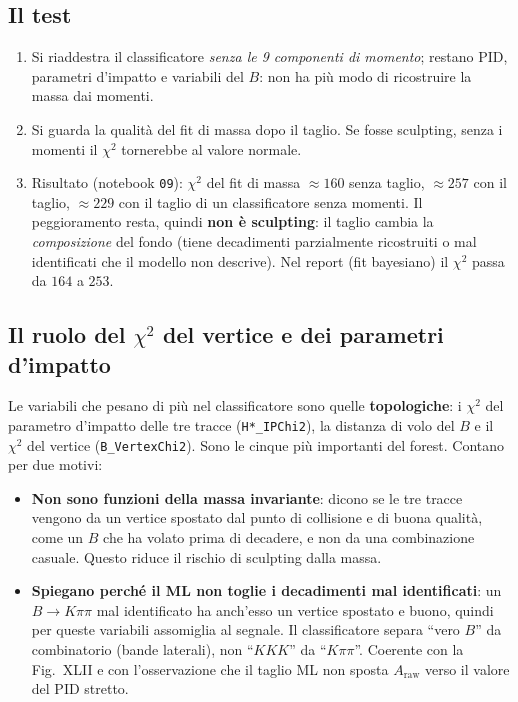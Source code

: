 \documentclass[10.5pt,a4paper]{article}
\newcommand{\Araw}{A_{\mathrm{raw}}}
\begin{document}
\subsection*{Il test}
\begin{enumerate}
\item Si riaddestra il classificatore \emph{senza le 9 componenti di momento}; restano PID, parametri d'impatto e variabili del $B$:
non ha più modo di ricostruire la massa dai momenti.
\item Si guarda la qualità del fit di massa dopo il taglio. Se fosse sculpting, senza i momenti il $\chi^2$ tornerebbe al valore normale.
\item Risultato (notebook \texttt{09}): $\chi^2$ del fit di massa $\approx160$ senza taglio, $\approx257$ con il taglio, $\approx229$
con il taglio di un classificatore senza momenti. Il peggioramento resta, quindi \textbf{non è sculpting}: il taglio cambia la
\emph{composizione} del fondo (tiene decadimenti parzialmente ricostruiti o mal identificati che il modello non descrive). Nel report
(fit bayesiano) il $\chi^2$ passa da $164$ a $253$.
\end{enumerate}

\subsection*{Il ruolo del $\chi^2$ del vertice e dei parametri d'impatto}
Le variabili che pesano di più nel classificatore sono quelle \textbf{topologiche}: i $\chi^2$ del parametro d'impatto delle tre tracce
(\texttt{H*\_IPChi2}), la distanza di volo del $B$ e il $\chi^2$ del vertice (\texttt{B\_VertexChi2}). Sono le cinque più importanti del
forest. Contano per due motivi:
\begin{itemize}
\item \textbf{Non sono funzioni della massa invariante}: dicono se le tre tracce vengono da un vertice spostato dal punto di
collisione e di buona qualità, come un $B$ che ha volato prima di decadere, e non da una combinazione casuale. Questo riduce il rischio
di sculpting dalla massa.
\item \textbf{Spiegano perché il ML non toglie i decadimenti mal identificati}: un $B\to K\pi\pi$ mal identificato ha anch'esso un
vertice spostato e buono, quindi per queste variabili assomiglia al segnale. Il classificatore separa ``vero $B$'' da combinatorio
(bande laterali), non ``$KKK$'' da ``$K\pi\pi$''. Coerente con la Fig.~XLII e con l'osservazione che il taglio ML non sposta $\Araw$ verso il
valore del PID stretto.
\end{itemize}
\end{document}
